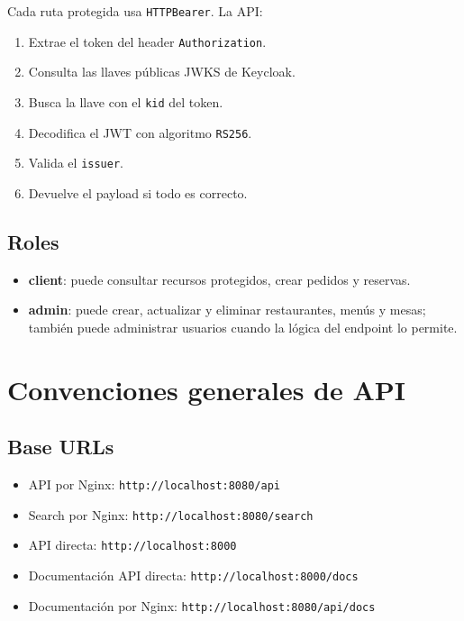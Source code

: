 \documentclass[12pt,letterpaper]{article}
\def\codefile#1{\nolinkurl{#1}}
\begin{document}
Cada ruta protegida usa \codefile{HTTPBearer}. La API:

\begin{enumerate}
    \item Extrae el token del header \codefile{Authorization}.
    \item Consulta las llaves públicas JWKS de Keycloak.
    \item Busca la llave con el \codefile{kid} del token.
    \item Decodifica el JWT con algoritmo \codefile{RS256}.
    \item Valida el \codefile{issuer}.
    \item Devuelve el payload si todo es correcto.
\end{enumerate}

\subsection{Roles}

\begin{itemize}
    \item \textbf{client}: puede consultar recursos protegidos, crear pedidos y reservas.
    \item \textbf{admin}: puede crear, actualizar y eliminar restaurantes, menús y mesas; también puede administrar usuarios cuando la lógica del endpoint lo permite.
\end{itemize}

\section{Convenciones generales de API}

\subsection{Base URLs}

\begin{itemize}
    \item API por Nginx: \codefile{http://localhost:8080/api}
    \item Search por Nginx: \codefile{http://localhost:8080/search}
    \item API directa: \codefile{http://localhost:8000}
    \item Documentación API directa: \codefile{http://localhost:8000/docs}
    \item Documentación por Nginx: \codefile{http://localhost:8080/api/docs}
\end{itemize}
\end{document}
